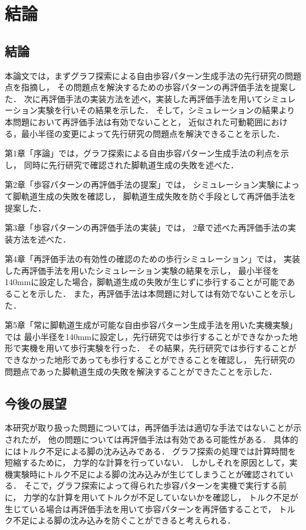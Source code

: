 ﻿

\chapter{結論}\label{chapter:結論}

\section{結論}

本論文では，まずグラフ探索による自由歩容パターン生成手法の先行研究の問題点を指摘し，
その問題点を解決するための歩容パターンの再評価手法を提案した．
次に再評価手法の実装方法を述べ，実装した再評価手法を用いてシミュレーション実験を行いその結果を示した．
そして，シミュレーションの結果より本問題において再評価手法は有効でないことと，
近似された可動範囲における，最小半径の変更によって先行研究の問題点を解決できることを示した．

第1章「序論」では，グラフ探索による自由歩容パターン生成手法の利点を示し，
同時に先行研究で確認された脚軌道生成の失敗を述べた．

第2章「歩容パターンの再評価手法の提案」では，
シミュレーション実験によって脚軌道生成の失敗を確認し，
脚軌道生成失敗を防ぐ手段として再評価手法を提案した．

第3章「歩容パターンの再評価手法の実装」では，
2章で述べた再評価手法の実装方法を述べた．

第4章「再評価手法の有効性の確認のための歩行シミュレーション」では，
実装した再評価手法を用いたシミュレーション実験の結果を示し，
最小半径を140mmに設定した場合，脚軌道生成の失敗が生じずに歩行することが可能であることを示した．
また，再評価手法は本問題に対しては有効でないことを示した．

第5章「常に脚軌道生成が可能な自由歩容パターン生成手法を用いた実機実験」では
最小半径を140mmに設定し，先行研究では歩行することができなかった地形で実機を用いて歩行実験を行った．
その結果，先行研究では歩行することができなかった地形であっても歩行することができることを確認し，
先行研究の問題点であった脚軌道生成の失敗を解決することができたことを示した．

\section{今後の展望}
本研究が取り扱った問題については，再評価手法は適切な手法ではないことが示されたが，
他の問題については再評価手法は有効である可能性がある．
具体的にはトルク不足による脚の沈み込みである．
グラフ探索の処理では計算時間を短縮するために，
力学的な計算を行っていない．
しかしそれを原因として，実機実験時にトルク不足による脚の沈み込みが生じてしまうことが確認されている．
そこで，グラフ探索によって得られた歩容パターンを実機で実行する前に，
力学的な計算を用いてトルクが不足していないかを確認し，
トルク不足が生じている場合は再評価手法を用いて歩容パターンを再評価することで，
トルク不足による脚の沈み込みを防ぐことができると考えられる．

